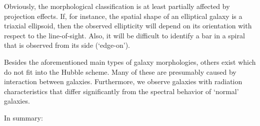 \documentclass[a4paper,11pt]{article}
\begin{document}
{\noindent}Obviously, the morphological classification is at least partially affected by projection effects. If, for instance, the spatial shape of an elliptical galaxy is a triaxial ellipsoid, then the observed ellipticity will depend on its orientation with respect to the line-of-sight. Also, it will be difficult to identify a bar in a spiral that is observed from its side (`edge-on').

{\noindent}Besides the aforementioned main types of galaxy morphologies, others exist which do not fit into the Hubble scheme. Many of these are presumably caused by interaction between galaxies. Furthermore, we observe galaxies with radiation characteristics that differ significantly from the spectral behavior of `normal' galaxies.

{\noindent}In summary:
\end{document}
